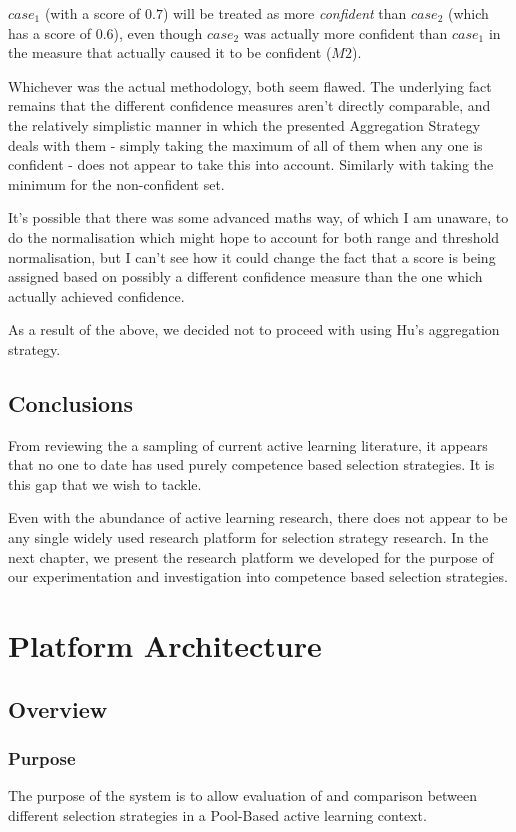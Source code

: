 \documentclass[a4paper,11pt]{report}
\begin{document}
\begin{enumerate}
	$case_{1}$ (with a score of $0.7$) will be treated as more \emph{confident} than $case_{2}$ (which has a score of $0.6$), even though $case_{2}$ was actually more confident than $case_{1}$ in the measure that actually caused it to be confident ($M2$).
	
\end{enumerate}

Whichever was the actual methodology, both seem flawed. The underlying fact remains that the different confidence measures aren't directly comparable, and the relatively simplistic manner in which the presented Aggregation Strategy deals with them - simply taking the maximum of all of them when any one is confident - does not appear to take this into account. Similarly with taking the minimum for the non-confident set.

It's possible that there was some advanced maths way, of which I am unaware, to do the normalisation which might hope to account for both range and threshold normalisation, but I can't see how it could change the fact that a score is being assigned based on possibly a different confidence measure than the one which actually achieved confidence.

As a result of the above, we decided not to proceed with using Hu's aggregation strategy.

\section{Conclusions}
From reviewing the a sampling of current active learning literature, it appears that no one to date has used purely competence based selection strategies. It is this gap that we wish to tackle. 

Even with the abundance of active learning research, there does not appear to be any single widely used research platform for selection strategy research. In the next chapter, we present the research platform we developed for the purpose of our experimentation and investigation into competence based selection strategies.

\chapter{Platform Architecture\label{cha:platarch}}
\section{Overview}
\subsection{Purpose}
The purpose of the system is to allow evaluation of and comparison between different selection strategies in a Pool-Based active learning context.
\end{document}
